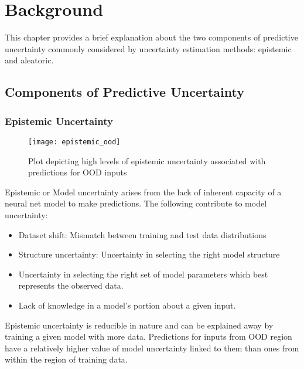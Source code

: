 

    \chapter{Background}
	This chapter provides a brief explanation about the two components of predictive uncertainty commonly considered by uncertainty estimation methods: epistemic and aleatoric.
	\section{Components of Predictive Uncertainty} 
	\subsection{Epistemic Uncertainty}
		\begin{figure}[H]
		\centering
		\texttt{[image: epistemic\_ood]}
		\caption{Plot depicting high levels of epistemic uncertainty associated with predictions for OOD inputs}
		\label{fig_epi_ood}
		\end{figure}
	Epistemic or Model uncertainty arises from  the lack of inherent capacity of a neural net model to make predictions. The following contribute to model uncertainty:
	\begin{itemize}
		\item Dataset shift: Mismatch between training and test data distributions
		\item Structure uncertainty: Uncertainty in selecting the right model structure
		\item Uncertainty in selecting the right set of model parameters which best represents the observed data.
		\item Lack of knowledge in a model's portion about a given input.
	\end{itemize}
	Epistemic uncertainty is reducible in nature and can be explained away by training a given model with more data. Predictions for inputs from OOD region have a relatively higher value of model uncertainty linked to them than ones from within the region of training data. 


